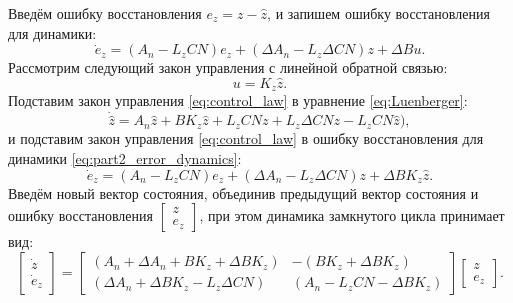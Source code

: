 Введём ошибку восстановления $e_z=z-\hat{z}$, и запишем ошибку восстановления для динамики:
%
\begin{equation}
	\label{eq:part2_error_dynamics}
	\dot{e}_z=({A}_n-{L}_z{C}{N}) e_z +(\Delta {A}_n -{L}_z\Delta {C}{N}) z +\Delta {B} u.
\end{equation}
%
Рассмотрим следующий закон управления с линейной обратной связью:
%
\begin{equation}
	\label{eq:control_law}
	u={K}_z\hat{z}.
\end{equation}
%
Подставим закон управления \eqref{eq:control_law} в уравнение \eqref{eq:Luenberger}:
\begin{equation}
	\label{eq:Luenberger_K}
	\dot{\hat{z}}={A}_n\hat{z}+{B}K_z \hat{z} +{L}_z C N z +{L}_z \Delta C N z- {L}_z {C} {N}\hat{z}),
\end{equation}
и подставим закон управления \eqref{eq:control_law} в ошибку восстановления для динамики \eqref{eq:part2_error_dynamics}:
%
\begin{equation}
	\label{eq:error_dynamics_K}
	\dot{e}_z=({A}_n-{L}_z{C}{N}) e_z +(\Delta {A}_n -{L}_z\Delta {C}{N}) z +\Delta {B} K_z \hat{z}.
\end{equation}
%
Введём новый вектор состояния, объединив предыдущий вектор состояния и ошибку восстановления $ \begin{bmatrix}
	z \\ e_z
\end{bmatrix}$, при этом динамика замкнутого цикла принимает вид:
%
\begin{equation}
	\label{eq:part2_system}
	\begin{bmatrix}
		\dot{z} \\ \dot{e}_z
	\end{bmatrix}=\begin{bmatrix}
		({A}_n+\Delta {A}_n +{B}{K}_z+\Delta {B}{K}_z) & -({B}{K}_z+\Delta {B}{K}_z) \\
		(\Delta {A}_n +\Delta {B}{K}_z-{L}_z\Delta {C}{N}) & ({A}_n-{L}_z{C}{N}-\Delta {B}{K}_z)        \end{bmatrix}\begin{bmatrix}
		z \\ e_z
	\end{bmatrix}.
\end{equation}

